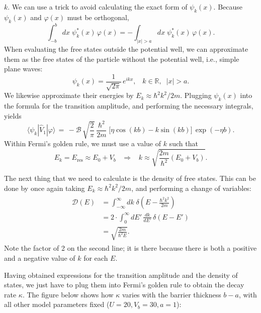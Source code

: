 \documentclass[pra,12pt]{revtex4}
\begin{document}
$k$.  We can use a trick to avoid calculating the exact form of
$\psi_k(x)$.  Because $\psi_k(x)$ and $\varphi(x)$ must be orthogonal,
\begin{equation}
  \int_{-b}^b dx \; \psi_k^*(x) \,\varphi(x) = - \int_{|x| > a} dx \; \psi_k^*(x) \,\varphi(x).
\end{equation}
When evaluating the free states outside the potential well, we can
approximate them as the free states of the particle without the
potential well, i.e., simple plane waves:
\begin{equation}
  \psi_k(x) = \frac{1}{\sqrt{2\pi}}\, e^{ikx}, \;\;\;k\in\mathbb{R}, \;\;|x|>a.
\end{equation}
We likewise approximate their energies by $E_k \approx \hbar^2k^2/2m$.
Plugging $\psi_k(x)$ into the formula for the transition amplitude,
and performing the necessary integrals, yields
\begin{equation}
  \langle\psi_k|\hat{V}_1|\varphi\rangle \,=\, - \mathcal{B} \, \sqrt{\frac{2}{\pi}} \, \frac{\hbar^2}{2m} \; \big[\eta\cos(kb) - k\sin(kb)\big] \, \exp(-\eta b).
\end{equation}
Within Fermi's golden rule, we must use a value of $k$ such that
\begin{equation}
  E_k = E_{\mathrm{res}} \approx E_0 + V_b \;\;\;\Rightarrow \;\;\; k \approx \sqrt{\frac{2m}{\hbar^2}(E_0+V_b)}.
\end{equation}

The next thing that we need to calculate is the density of free
states.  This can be done by once again taking $E_k \approx
\hbar^2k^2/2m$, and performing a change of variables:
\begin{align}
  \begin{aligned}\mathcal{D}(E) &= \int_{-\infty}^\infty dk \; \delta\left(E-\frac{\hbar^2k^2}{2m}\right) \\ &= 2 \cdot \int_0^\infty dE' \, \frac{dk}{dE'} \, \delta(E-E') \\ &= \sqrt{\frac{2m}{\hbar^2 E}}.
  \end{aligned}
\end{align}
Note the factor of 2 on the second line; it is there because there is
both a positive and a negative value of $k$ for each $E$.

Having obtained expressions for the transition amplitude and the
density of states, we just have to plug them into Fermi's golden rule
to obtain the decay rate $\kappa$.  The figure below shows how
$\kappa$ varies with the barrier thickness $b-a$, with all other model
parameters fixed ($U = 20, V_b = 30, a = 1$):
\end{document}
